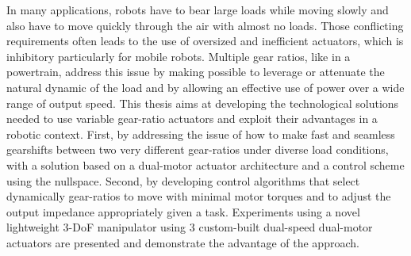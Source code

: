 In many applications, robots have to bear large loads while moving slowly and also have to move quickly through the air with almost no loads. Those conflicting requirements often leads to the use of oversized and inefficient actuators, which is inhibitory particularly for mobile robots. Multiple gear ratios, like in a powertrain, address this issue by making possible to leverage or attenuate the natural dynamic of the load and by allowing an effective use of power over a wide range of output speed. This thesis aims at developing the technological solutions needed to use variable gear-ratio actuators and exploit their advantages in a robotic context. First, by addressing the issue of how to make fast and seamless gearshifts between two very different gear-ratios under diverse load conditions, with a solution based on a dual-motor actuator architecture and a control scheme using the nullspace. Second, by developing control algorithms that select dynamically gear-ratios to move with minimal motor torques and to adjust the output impedance appropriately given a task. Experiments using a novel lightweight 3-DoF manipulator using 3 custom-built dual-speed dual-motor actuators are presented and demonstrate the advantage of the approach. 


